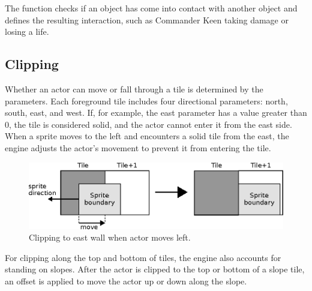 \documentclass[book.tex]{subfiles}
\begin{document}
\par
\begin{minipage}{\textwidth}
  
\end{minipage}
\label{state_type}

\par
The  function checks if an object has come into contact with another object and defines the resulting interaction, such as Commander Keen taking damage or losing a life.



\subsection{Clipping}
\label{section:clipping}
Whether an actor can move or fall through a tile is determined by the  parameters. Each foreground tile includes four directional parameters: north, south, east, and west. If, for example, the east parameter has a value greater than 0, the tile is considered solid, and the actor cannot enter it from the east side. When a sprite moves to the left and encounters a solid tile from the east, the engine adjusts the actor's movement to prevent it from entering the tile.\\


\begin{figure}[H]
  \centering
  \includegraphics[width=\textwidth]{imgs/drawings/clipping_east.eps}
  \caption{Clipping to east wall when actor moves left.}
  \label{fig:clipping_east}  
\end{figure}

\par
\begin{minipage}{\textwidth}
  
\end{minipage}
\label{wallclip_array}
\par
For clipping along the top and bottom of tiles, the engine also accounts for standing on slopes. After the actor is clipped to the top or bottom of a slope tile, an offset is applied to move the actor up or down along the slope. \\
\end{document}
